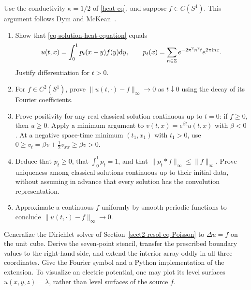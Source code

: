 
\begin{exo}
\label{exo-unicite-eq-heat}
Use the conductivity $\kappa=1/2$ of \eqref{heat-eq}, and suppose
$f\in C(S^1)$. This argument follows Dym and McKean~\cite{dym}.
\begin{enumerate}
\item Show that \eqref{eq-solution-heat-equation} equals
\[
 u(t,x)=\int_0^1p_t(x-y)f(y)\mathrm{d} y,\qquad
 p_t(x)=\sum_{n\in\mathbb{Z}}e^{-2\pi^2n^2t}e^{2\pi\mathrm{i} nx}.
\]
Justify differentiation for $t>0$.
\item For $f\in C^2(S^1)$, prove $\|u(t,\cdot)-f\|_\infty\to0$
as $t\downarrow0$ using the decay of its Fourier coefficients.
\item Prove positivity for any real classical solution continuous up to
$t=0$: if $f\geq0$, then $u\geq0$. Apply a minimum argument to
$v(t,x)=e^{\beta t}u(t,x)$ with $\beta<0$. At a negative space-time
minimum $(t_1,x_1)$ with $t_1>0$, use
$0\geq v_t=\beta v+\tfrac12v_{xx}\geq\beta v>0$.
\item Deduce that $p_t\geq0$, that $\int_0^1p_t=1$, and that
$\|p_t*f\|_\infty\leq\|f\|_\infty$. Prove uniqueness among classical
solutions continuous up to their initial data, without assuming in advance
that every solution has the convolution representation.
\item Approximate a continuous $f$ uniformly by smooth periodic functions
to conclude $\|u(t,\cdot)-f\|_\infty\to0$.
\end{enumerate}
\end{exo}


\begin{exo}
\label{exo-potential-electric-3d}
Generalize the Dirichlet solver of Section~\ref{sect2-resol-eq-Poisson} to
$\Delta u=f$ on the unit cube. Derive the seven-point stencil, transfer the
prescribed boundary values to the right-hand side, and extend the interior
array oddly in all three coordinates. Give the Fourier symbol and a Python
implementation of the extension. To visualize an electric potential, one
may plot its level surfaces $u(x,y,z)=\lambda$, rather than level surfaces
of the source $f$.
\end{exo}

